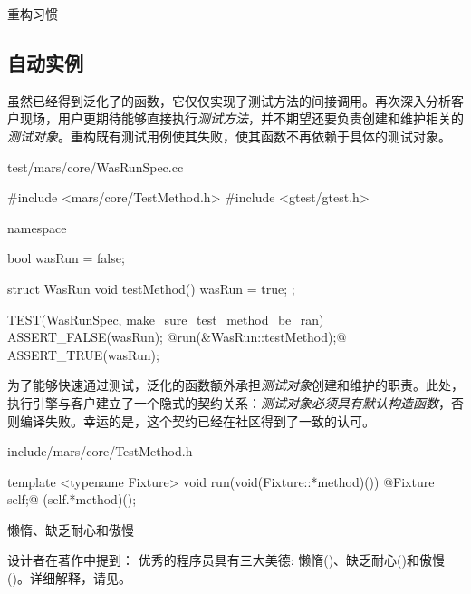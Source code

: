 \begin{content}
\begin{episode}{重构习惯}
\begin{content}
\end{content}
\end{episode}

\subsection{自动实例}

虽然已经得到泛化了的函数，它仅仅实现了测试方法的间接调用。再次深入分析客户现场，用户更期待能够直接执行\emph{测试方法}，并不期望还要负责创建和维护相关的\emph{测试对象}。重构既有测试用例使其失败，使其函数不再依赖于具体的测试对象。

\begin{nodiff}{test/mars/core/WasRunSpec.cc}
\begin{c++}
#include <mars/core/TestMethod.h>
#include <gtest/gtest.h>

namespace {
  bool wasRun = false;

  struct WasRun {
    void testMethod() {
      wasRun = true;
    }
  };
}

TEST(WasRunSpec, make_sure_test_method_be_ran) {
  ASSERT_FALSE(wasRun);
  @run(&WasRun::testMethod);@
  ASSERT_TRUE(wasRun);
}
\end{c++}
\end{nodiff}

为了能够快速通过测试，泛化的函数额外承担\emph{测试对象}创建和维护的职责。此处，执行引擎与客户建立了一个隐式的契约关系：\emph{测试对象必须具有默认构造函数}，否则编译失败。幸运的是，这个契约已经在社区得到了一致的认可。

\begin{nodiff}{include/mars/core/TestMethod.h}
\begin{c++}
template <typename Fixture>
void run(void(Fixture::*method)()) {
  @Fixture self;@
  (self.*method)();
}
\end{c++}
\end{nodiff}

\begin{episode}{懒惰、缺乏耐心和傲慢}
\begin{content}

设计者在著作中提到：
优秀的程序员具有三大美德: 懒惰()、缺乏耐心()和傲慢()。详细解释，请见。


\end{content}
\end{episode}
\end{content}
